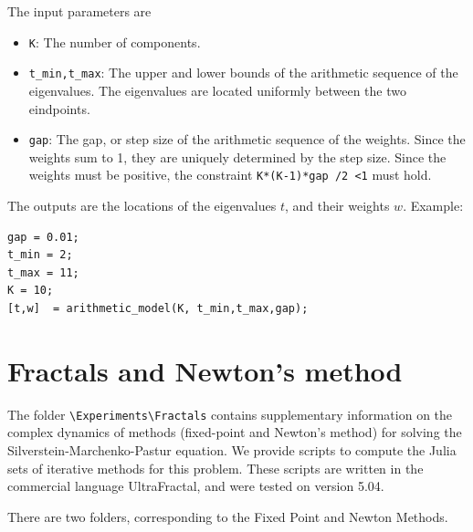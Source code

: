 \documentclass[english,11pt]{article} %
\begin{document}
The input parameters are 

\begin{itemize}
\item \verb+K+:  The number of components.
\item \verb+t_min,t_max+:  The upper and lower bounds of the arithmetic sequence of the eigenvalues. The eigenvalues are located uniformly between the two eindpoints.
\item \verb+gap+: The gap, or step size of the arithmetic sequence of the weights. Since the weights sum to 1, they are uniquely determined by the step size. Since the weights must be positive, the constraint \verb+K*(K-1)*gap /2 <1+ must hold. 
\end{itemize}

The outputs are the locations of the eigenvalues $t$, and their weights $w$. 
Example:

\begin{verbatim}
gap = 0.01;
t_min = 2;
t_max = 11;
K = 10;
[t,w]  = arithmetic_model(K, t_min,t_max,gap);
\end{verbatim}

\section{Fractals and Newton's method}

The  folder \verb+\Experiments\Fractals+  contains supplementary information on the complex dynamics of methods (fixed-point and Newton's method) for solving the Silverstein-Marchenko-Pastur equation. We provide scripts to compute the Julia sets of iterative methods for 
this problem. These scripts are written in the commercial language UltraFractal, and were tested on version 5.04. 

There are two folders, corresponding to the Fixed Point and Newton Methods.
\end{document}
